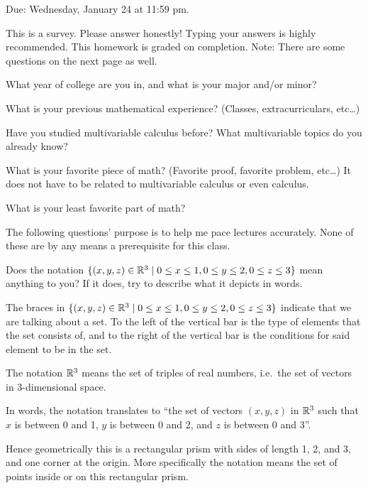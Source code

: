 \maketitle

Due: Wednesday, January 24 at 11:59 pm.

This is a survey. Please answer honestly! Typing your answers is highly recommended. This homework is graded on completion. Note: There are some questions on the next page as well.

\begin{question}
  What year of college are you in, and what is your major and/or minor?
\end{question}

\begin{question}
  What is your previous mathematical experience? (Classes, extracurriculars, etc\ldots)
\end{question}

\begin{question}
  Have you studied multivariable calculus before? What multivariable topics do you already know?
\end{question}

\begin{question}
  What is your favorite piece of math? (Favorite proof, favorite problem, etc\ldots) It does not have to be related to multivariable calculus or even calculus.
\end{question}

\begin{question}
  What is your least favorite part of math?
\end{question}

The following questions' purpose is to help me pace lectures accurately. None of these are by any means a prerequisite for this class.

\begin{question}
  Does the notation $\{(x,y,z)\in\mathbb R^3\mid 0\leq x\leq 1, 0\leq y\leq 2, 0\leq z\leq 3\}$ mean anything to you? If it does, try to describe what it depicts in words.
\end{question}
\begin{solution}
  The braces in $\{(x,y,z)\in\mathbb R^3\mid 0\leq x\leq 1, 0\leq y\leq 2, 0\leq z\leq 3\}$ indicate that we are talking about a set. To the left of the vertical bar is the type of elements that the set consists of, and to the right of the vertical bar is the conditions for said element to be in the set.

  The notation $\mathbb R^3$ means the set of triples of real numbers, i.e.\ the set of vectors in 3-dimensional space.

  In words, the notation translates to ``the set of vectors $(x,y,z)$ in $\mathbb R^3$ such that $x$ is between 0 and 1, $y$ is between 0 and 2, and $z$ is between 0 and 3''.

  Hence geometrically this is a rectangular prism with sides of length 1, 2, and 3, and one corner at the origin. More specifically the notation means the set of points inside or on this rectangular prism.
\end{solution}

